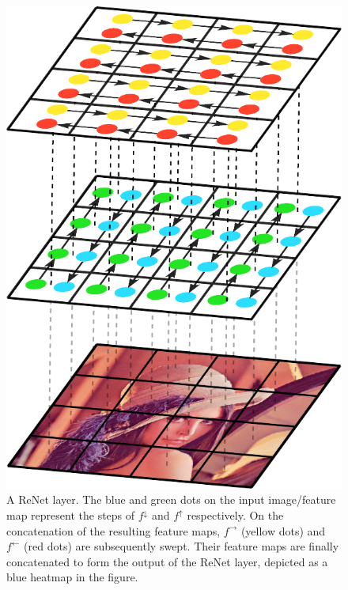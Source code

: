%

\begin{figure}[t]
    \begin{center}
        \includegraphics[width=0.3\columnwidth]{pdf/first_layer.pdf}
        \caption{A ReNet layer. The blue and green dots on the input
            image/feature map represent the steps of $f^{\downarrow}$ and
            $f^{\uparrow}$ respectively. On the concatenation of the resulting
            feature maps, $f^{\rightarrow}$ (yellow dots) and $f^{\leftarrow}$
            (red dots) are subsequently swept. Their feature maps are finally
            concatenated to form the output of the ReNet layer, depicted as a
            blue heatmap in the figure.}
        \label{fig:first_layer}
        \vspace{-5mm}
    \end{center}
\end{figure}


